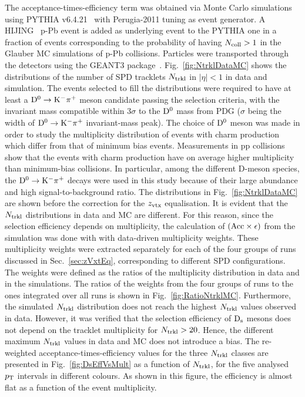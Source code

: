 The acceptance-times-efficiency term was obtained via Monte Carlo simulations
using PYTHIA v6.4.21~\cite{Sjostrand:2006za} with Perugia-2011 tuning as event generator.  
A HIJING~\cite{Wang:1991hta} p-Pb event is added as underlying event to the PYTHIA
one in a fraction of events corresponding to the probability of having $N_{\rm coll}>1$ in the
Glauber MC simulations of p-Pb collisions. 
Particles were transported through the detectors using the GEANT3 package~\cite{Brun:1994aa}.
Fig.~\ref{fig:NtrklDataMC} shows the distributions of the number of SPD tracklets $N_{\rm trkl}$ in $|\eta|<1$ in data and simulation.
The events selected to fill the distributions were required to have at least a ${\rm D^0\to K^-\pi^+}$ meson candidate 
passing the selection criteria, with the invariant mass compatible within 3$\sigma$ to the ${\rm D^0}$ mass from PDG 
($\sigma$ being the width of ${\rm D^0\to K^-\pi^+}$ invariant-mass peak).
The choice of ${\rm D^0}$ meson was made in order to study the multiplicity distribution
of events with charm production which differ from that of minimum bias events.
Measurements in pp collisions~\cite{} show that the events with charm production
have on average higher multiplicity than minimum-bias collisions.
In particular, among the different D-meson species, the ${\rm D^0\to K^-\pi^+}$ decays
were used in this study because of their large abundance and high signal-to-background ratio.
The distributions in Fig.~\ref{fig:NtrklDataMC} are shown before the correction for the $z_{\rm vtx}$ equalisation. 
It is evident that the $N_{\rm trkl}$ distributions in data and MC are different.
For this reason, since the selection efficiency depends on multiplicity, the calculation
of $({\rm Acc} \times \epsilon)$ from the simulation was done with 
with data-driven multiplicity weights. These multiplicity weights were extracted
separately for each of the four groups of runs discussed in Sec.~\ref{sec:zVxtEq},
corresponding to different SPD configurations.
The weights were defined as the ratios of the multiplicity distribution in data and in 
the simulations. The ratios of the weights from the four groups of runs to the ones integrated over
all runs is shown in Fig.~\ref{fig:RatioNtrklMC}.
Furthermore, the simulated $N_{\rm trkl}$ distribution does not reach the highest 
$N_{\rm trkl}$ values observed in data. However, it was verified 
that the selection efficiency of ${\rm D_s}$ mesons does not depend on
the tracklet multiplicity for $N_{\rm trkl} > 20$. Hence, the different
maximum $N_{\rm trkl}$ values in data and MC does not introduce a bias.
The re-weighted acceptance-times-efficiency values for the three $N_{\rm trkl}$ classes are presented in 
Fig.~\ref{fig:DsEffVsMult} as a function of $N_{\rm trkl}$, for the five analysed $p_{\rm T}$ intervals
in different colours. As shown in this figure, the efficiency is almost flat 
as a function of the event multiplicity.\\


